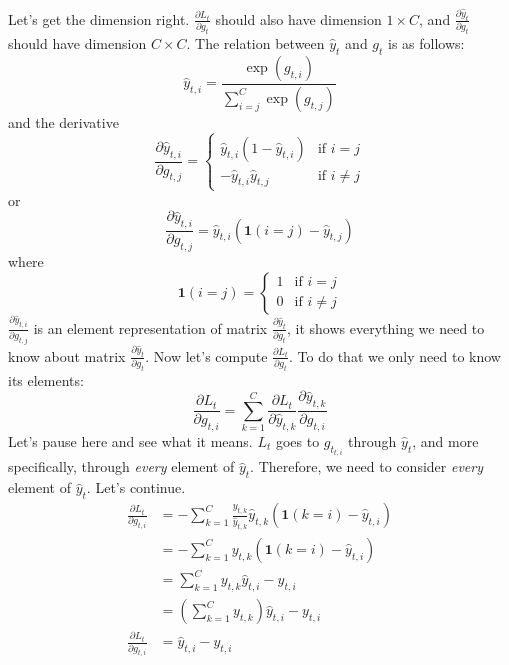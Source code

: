 \documentclass{article}
\begin{document}
Let's get the dimension right. $\frac{\partial L_t}{\partial g_t}$ should also have dimension $1\times C$, and $\frac{\partial \hat{y}_t}{\partial g_t}$ should have dimension $C\times C$. The relation between $\hat{y}_t$ and $g_t$ is as follows:
\begin{equation}
    \hat{y}_{t, i} = \frac{\exp(g_{t, i})}{\sum_{i=j}^C\exp(g_{t, j})}
\end{equation}
and the derivative
\begin{equation}
    \frac{\partial \hat{y}_{t, i}}{\partial g_{t, j}} = 
    \begin{cases}
    \hat{y}_{t, i}(1 - \hat{y}_{t, i}) & \text{if }i = j\\
    -\hat{y}_{t, i}\hat{y}_{t, j} & \text{if }i \neq j
    \end{cases}
\end{equation}
or 
\begin{equation}
    \frac{\partial \hat{y}_{t, i}}{\partial g_{t, j}} = \hat{y}_{t, i}(\mathbf{1}(i=j) - \hat{y}_{t, j})    
\end{equation}
where 
\begin{equation}
    \mathbf{1}(i=j) = 
    \begin{cases}
    1 & \text{if }i = j \\
    0 & \text{if }i\neq j
    \end{cases}
\end{equation}
$\frac{\partial \hat{y}_{t, i}}{\partial g_{t, j}}$ is an element representation of matrix $\frac{\partial \hat{y}_t}{\partial g_t}$, it shows everything we need to know about matrix $\frac{\partial \hat{y}_t}{\partial g_t}$. Now let's compute $\frac{\partial L_t}{\partial g_t}$. To do that we only need to know its elements:
\begin{equation}
    \frac{\partial L_t}{\partial g_{t, i}} = \sum_{k=1}^C\frac{\partial L_t}{\partial \hat{y}_{t, k}}\frac{\partial \hat{y}_{t, k}}{\partial g_{t, i}}
\end{equation}
Let's pause here and see what it means. $L_t$ goes to $g_{t_{t, i}}$ through $\hat{y}_t$, and more specifically, through \emph{every} element of $\hat{y}_t$. Therefore, we need to consider  \emph{every} element of $\hat{y}_t$. Let's continue.
\begin{align}
     \frac{\partial L_t}{\partial g_{t, i}} &=
     -\sum_{k=1}^C\frac{y_{t, k}}{\hat{y}_{t, k}}\hat{y}_{t, k}(\mathbf{1}(k=i) - \hat{y}_{t, i}) \\
     &= -\sum_{k=1}^Cy_{t, k}(\mathbf{1}(k=i) - \hat{y}_{t, i}) \\
     &= \sum_{k=1}^Cy_{t, k}\hat{y}_{t, i} - y_{t, i}\\
     &= (\sum_{k=1}^Cy_{t, k})\hat{y}_{t, i} - y_{t, i} \label{eq-1} \\
     \frac{\partial L_t}{\partial g_{t, i}} &= \hat{y}_{t, i} - y_{t, i} \label{eq-2}
\end{align}
\end{document}
